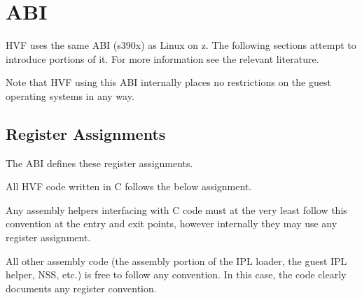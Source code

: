 \chapter{ABI}
\label{chap:abi}
HVF uses the same ABI (s390x) as Linux on z.  The following sections attempt
to introduce portions of it.  For more information see the relevant
literature.

Note that HVF using this ABI internally places no restrictions on the guest
operating systems in any way.

\section{Register Assignments}
\label{sec:registers}
The ABI defines these register assignments.

\cbstart
All HVF code written in C follows the below assignment.

Any assembly helpers interfacing with C code must at the very least follow
this convention at the entry and exit points, however internally they may
use any register assignment.

All other assembly code (the assembly portion of the IPL loader, the guest
IPL helper, NSS, etc.) is free to follow any convention.  In this case, the
code clearly documents any register convention.
\cbend

